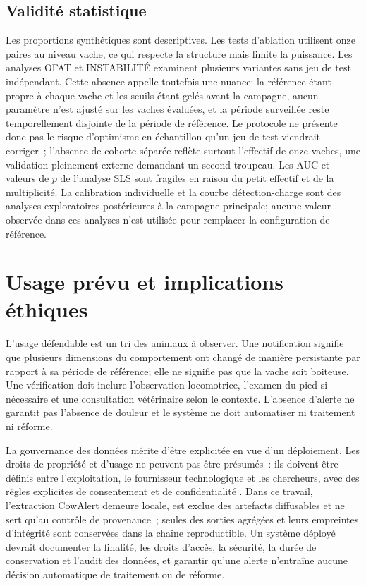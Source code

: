 \subsection{Validité statistique}
Les proportions synthétiques sont descriptives. Les tests d'ablation utilisent onze paires
au niveau vache, ce qui respecte la structure mais limite la puissance. Les analyses OFAT et
INSTABILITÉ examinent plusieurs variantes sans jeu de test indépendant. Cette absence appelle
toutefois une nuance: la référence étant propre à chaque vache et les seuils étant gelés avant
la campagne, aucun paramètre n'est ajusté sur les vaches évaluées, et la période surveillée
reste temporellement disjointe de la période de référence. Le protocole ne présente donc pas
le risque d'optimisme en échantillon qu'un jeu de test viendrait corriger~; l'absence de
cohorte séparée reflète surtout l'effectif de onze vaches, une validation pleinement externe
demandant un second troupeau. Les AUC et valeurs de
$p$ de l'analyse SLS sont fragiles en raison du petit effectif et de la multiplicité. La
calibration individuelle et la courbe détection-charge sont des analyses exploratoires
postérieures à la campagne principale; aucune valeur observée dans ces analyses n'est
utilisée pour remplacer la configuration de référence.

\section{Usage prévu et implications éthiques}

L'usage défendable est un tri des animaux à observer. Une notification signifie que plusieurs
dimensions du comportement ont changé de manière persistante par rapport à sa période de
référence; elle ne signifie pas que la vache soit boiteuse. Une vérification doit inclure l'observation
locomotrice, l'examen du pied si nécessaire et une consultation vétérinaire selon le contexte.
L'absence d'alerte ne garantit pas l'absence de douleur et le système ne doit automatiser ni
traitement ni réforme.

La gouvernance des données mérite d'être explicitée en vue d'un déploiement. Les droits de
propriété et d'usage ne peuvent pas être présumés~: ils doivent être définis entre
l'exploitation, le fournisseur technologique et les chercheurs, avec des règles explicites
de consentement et de confidentialité \citep{wolfert2017big,carbonell2016ethics}. Dans ce
travail, l'extraction CowAlert demeure locale, est exclue des artefacts diffusables et ne sert
qu'au contrôle de provenance~; seules des sorties agrégées et leurs empreintes d'intégrité
sont conservées dans la chaîne reproductible. Un système déployé devrait documenter la
finalité, les droits d'accès, la sécurité, la durée de conservation et l'audit des données,
et garantir qu'une alerte n'entraîne aucune décision automatique de traitement ou de réforme.

